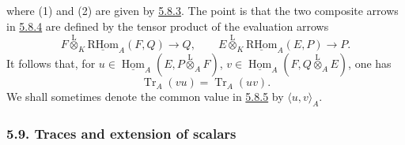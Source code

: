 \documentclass[11pt]{article}
\providecommand{\uHom}{\underline{\Hom}}
\providecommand{\uRHom}{\underline{\RHom}}
\DeclareMathOperator{\Hom}{Hom}
\providecommand{\RHom}{\mathrm{RHom}}
\providecommand{\Tr}{\operatorname{Tr}}
\providecommand{\Tr}{\operatorname{Tr}}
\providecommand{\lten}{\overset{\mathrm L}{\otimes}}
\providecommand{\Tr}{\operatorname{Tr}}
\providecommand{\RHom}{\mathrm{RHom}}
\providecommand{\Hom}{\operatorname{Hom}}
\providecommand{\lten}{\overset{\mathrm L}{\otimes}}
\providecommand{\RHom}{\mathrm R\mathcal{H}om}
\providecommand{\lten}{\overset{\mathrm L}{\otimes}}
\providecommand{\Tr}{\operatorname{Tr}}
\providecommand{\lten}{\overset{\mathrm L}{\otimes}}
\providecommand{\lten}{\overset{\mathrm L}{\otimes}}
\providecommand{\lten}{\overset{\mathrm L}{\otimes}}
\providecommand{\RHom}{\mathrm{RHom}}
\providecommand{\Hom}{\operatorname{Hom}}
\providecommand{\Tr}{\operatorname{Tr}}
\providecommand{\lten}{\overset{\mathrm L}{\otimes}}
\begin{document}
where (1) and (2) are given by \hyperref[sga5:IIIB:equation:5.8.3]{5.8.3}. The point is that the two composite arrows in \hyperref[sga5:IIIB:equation:5.8.4]{5.8.4} are defined by the tensor product of the evaluation arrows
\[
F\lten_K\uRHom_A(F,Q)\longrightarrow Q,\qquad
E\lten_K\uRHom_A(E,P)\longrightarrow P.
\]
It follows that, for $u\in\uHom_A(E,P\lten_AF)$, $v\in\uHom_A(F,Q\lten_AE)$, one has
\begin{equation}\tag{5.8.5}\label{sga5:IIIB:equation:5.8.5}
\Tr_A(vu)=\Tr_A(uv).
\end{equation}
We shall sometimes denote the common value in \hyperref[sga5:IIIB:equation:5.8.5]{5.8.5} by $\langle u,v\rangle_A$.

\subsubsection*{5.9. Traces and extension of scalars}\label{sga5:IIIB:subsubsection:5.9}
\end{document}

